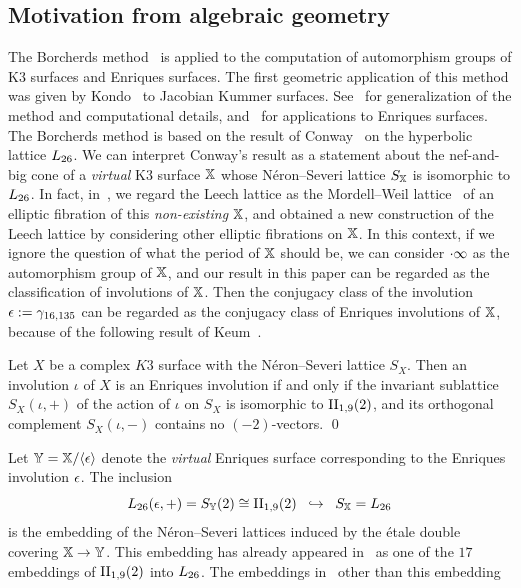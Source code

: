 \documentclass{amsart} %
\begin{document}
\subsection{Motivation from algebraic geometry}\label{subsec:alggeom}
%
The Borcherds method~\cite{MR913200, MR1654763}
is applied to the computation of automorphism groups of K3 surfaces and Enriques surfaces.
The first geometric application of this method was given 
by Kondo~\cite{MR1618132} to Jacobian Kummer surfaces.
See~\cite{MR3456710, MR4759604} for generalization of the method and computational details,
and~\cite{MR4498439, MR4389670} for applications to Enriques surfaces.
The Borcherds method is based on the result of Conway~\cite{MR690711} on 
the hyperbolic lattice $L_{26}$. 
We can interpret Conway's result 
as a statement about the nef-and-big cone of a \emph{virtual} K3 surface $\mathord{\mathbb{X}}$
 whose N\'eron--Severi lattice $S_{\mathord{\mathbb{X}}}$ is isomorphic to $L_{26}$.
 In fact,
in~\cite{MR4674939}, 
we regard the Leech lattice as the Mordell--Weil lattice~\cite{MR1081832} of an elliptic fibration of this \emph{non-existing} $\mathord{\mathbb{X}}$, 
and 
obtained a new construction of the Leech lattice
by considering other elliptic fibrations on  $\mathord{\mathbb{X}}$.
In this context, 
if we ignore  the question of what the period of $\mathord{\mathbb{X}}$ should be, 
we can consider $\cdot \infty$ as 
the automorphism group of $\mathord{\mathbb{X}}$,
and our result in this paper can be regarded as the classification of involutions of $\mathord{\mathbb{X}}$.
Then 
the conjugacy class of the involution $\epsilon:=\gamma_{16, 135}$ can be regarded 
 as the conjugacy class of Enriques involutions of $\mathord{\mathbb{X}}$,
 because of the following result of Keum~\cite{MR1060704}.
 \begin{proposition}
 Let $X$ be a complex $K3$ surface
with the N\'eron--Severi lattice $S_X$.
 Then an involution $\iota$ of $X$ is an Enriques involution
 if and only if the invariant sublattice $S_X(\iota, +)$ of 
 the action of $\iota$ on $S_X$ 
 is isomorphic to $\mathrm{II}_{1,9} (2)$,
 and its orthogonal complement $S_X(\iota, -)$
contains no $(-2)$-vectors.
 \qed
 \end{proposition}
%
Let $\mathord{\mathbb{Y}}=\mathord{\mathbb{X}}/\langle {\epsilon} \rangle$ denote the \emph{virtual} Enriques surface
corresponding to the Enriques involution $\epsilon$.
The inclusion 
\[
L_{26}(\epsilon, +)=S_{\mathord{\mathbb{Y}}}(2)\cong \mathrm{II}_{1,9} (2)\;\; \hookrightarrow \;\;S_{\mathord{\mathbb{X}}}=L_{26}
\]
is the embedding of the N\'eron--Severi lattices
induced by the \'etale double covering $\mathord{\mathbb{X}}\to \mathord{\mathbb{Y}}$.
This embedding 
has already appeared in~\cite{MR4389670} as one of the $17$ embeddings 
of $\mathrm{II}_{1,9} (2)$ into $L_{26}$.
The embeddings in~\cite{MR4389670} other than this embedding 
\end{document}
